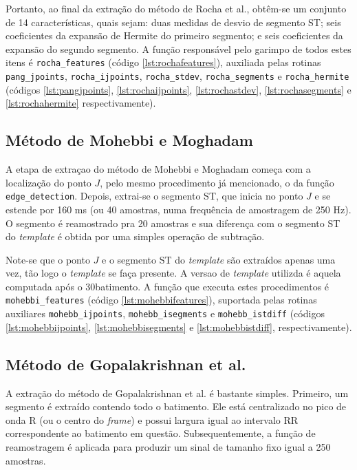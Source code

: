 Portanto, ao final da extração do método de Rocha et al., obtêm-se um conjunto de 14 características, quais sejam: duas medidas de desvio de segmento ST; seis coeficientes da expansão de Hermite do primeiro segmento; e seis coeficientes da expansão do segundo segmento. A função responsável pelo garimpo de todos estes itens é \texttt{rocha\_features} (código \ref{lst:rochafeatures}), auxiliada pelas rotinas \texttt{pang\_jpoints}, \texttt{rocha\_ijpoints}, \texttt{rocha\_stdev}, \texttt{rocha\_segments} e \texttt{rocha\_hermite} (códigos \ref{lst:pangjpoints}, \ref{lst:rochaijpoints}, \ref{lst:rochastdev}, \ref{lst:rochasegments} e \ref{lst:rochahermite} respectivamente).

\subsection*{Método de Mohebbi e Moghadam}
A etapa de extraçao do método de Mohebbi e Moghadam começa com a localização do ponto $J$, pelo mesmo procedimento já mencionado, o da função \texttt{edge\_detection}. Depois, extrai-se o segmento ST, que inicia no ponto $J$ e se estende por 160 ms (ou 40 amostras, numa frequência de amostragem de 250 Hz). O segmento é reamostrado pra 20 amostras e sua diferença com o segmento ST do \emph{template} é obtida por uma simples operação de subtração.

Note-se que o ponto $J$ e o segmento ST do \emph{template} são extraídos apenas uma vez, tão logo o \emph{template} se faça presente. A versao de \emph{template} utilizda é aquela computada após o 30\ordm batimento. A função que executa estes procedimentos é \texttt{mohebbi\_features} (código \ref{lst:mohebbifeatures}), suportada pelas rotinas auxiliares \texttt{mohebb\_ijpoints}, \texttt{mohebb\_isegments} e \texttt{mohebb\_istdiff} (códigos \ref{lst:mohebbijpoints}, \ref{lst:mohebbisegments} e \ref{lst:mohebbistdiff}, respectivamente).

\subsection*{Método de Gopalakrishnan et al.}
A extração do método de Gopalakrishnan et al. é bastante simples. Primeiro, um segmento é extraído contendo todo o batimento. Ele está centralizado no pico de onda R (ou o centro do \emph{frame}) e possui largura igual ao intervalo RR correspondente ao batimento em questão. Subsequentemente, a função de reamostragem é aplicada para produzir um sinal de tamanho fixo igual a 250 amostras. 

